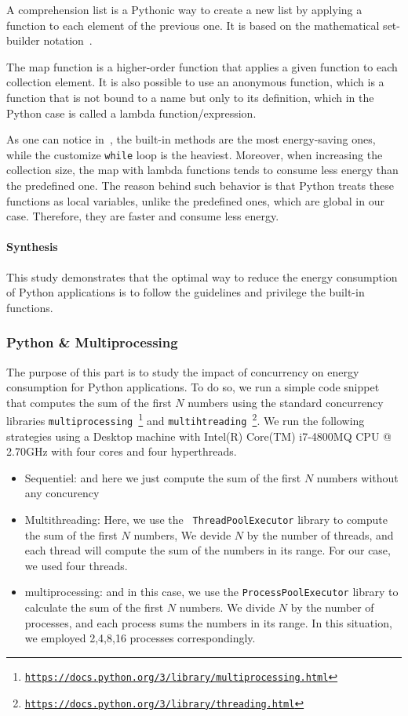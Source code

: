 A comprehension list is a Pythonic way to create a new list by applying a function to each element of the previous one. It is based on the mathematical set-builder notation~\cite{editiondiscrete}.

The map function is a higher-order function that applies a given function to each collection element. It is also possible to use an anonymous function, which is a function that is not bound to a name but only to its definition, which in the Python case is called a lambda function/expression.

As one can notice in~, the built-in methods are the most energy-saving ones, while the customize \texttt{while} loop is the heaviest.
Moreover, when increasing the collection size, the map with lambda functions tends to consume less energy than the predefined one.
The reason behind such behavior is that Python treats these functions as local variables, unlike the predefined ones, which are global in our case. Therefore, they are faster and consume less energy.


\paragraph*{Synthesis}
This study demonstrates that the optimal way to reduce the energy consumption of Python applications is to follow the guidelines and privilege the built-in functions.


\subsubsection{Python \& Multiprocessing}
The purpose of this part is to study the impact of concurrency on energy consumption for Python applications.
To do so, we run a simple code snippet that computes the sum of the first $N$ numbers using the standard concurrency libraries \texttt{multiprocessing~\footnote{\url{https://docs.python.org/3/library/multiprocessing.html}}} and \texttt{multihtreading~\footnote{\url{https://docs.python.org/3/library/threading.html}}}. We run the following strategies using a Desktop machine with Intel(R) Core(TM) i7-4800MQ CPU @ 2.70GHz with four cores and four hyperthreads.
\begin{itemize}
    \item Sequentiel: and here we just compute the sum of the first $N$ numbers without any concurency
    \item Multithreading: Here, we use the \texttt{ ThreadPoolExecutor} library to compute the sum of the first $N$ numbers, We devide $N$ by the number of threads, and each thread will compute the sum of the numbers in its range. For our case, we used four threads.
    \item multiprocessing: and in this case, we use the \texttt{ProcessPoolExecutor} library to calculate the sum of the first $N$ numbers. We divide $N$ by the number of processes, and each process sums the numbers in its range. In this situation, we employed 2,4,8,16 processes correspondingly.
\end{itemize}


